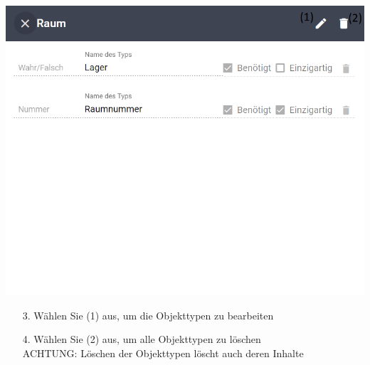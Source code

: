 \documentclass[11pt,a4paper]{report}
\begin{document}
	\begin{minipage}{0.5\linewidth}
	\includegraphics[width=\linewidth]{Objekttypedit.png}
	\end{minipage}
	\hfill
	\begin{minipage}{0.4\linewidth}
	\begin{itemize}
		\item[3.] Wählen Sie (1) aus, um die Objekttypen zu bearbeiten
		\item[4.] Wählen Sie (2) aus, um alle Objekttypen zu löschen\\
		ACHTUNG: Löschen der Objekttypen löscht auch deren Inhalte
	\end{itemize}
	\end{minipage}\\
\end{document}
